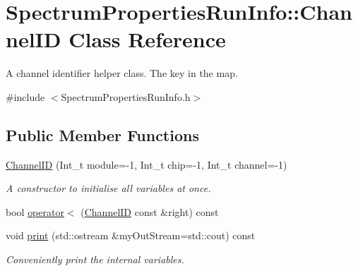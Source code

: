 \hypertarget{class_spectrum_properties_run_info_1_1_channel_i_d}{\section{Spectrum\-Properties\-Run\-Info\-:\-:Channel\-I\-D Class Reference}
\label{class_spectrum_properties_run_info_1_1_channel_i_d}
}


A channel identifier helper class. The key in the map.  




{\ttfamily \#include $<$Spectrum\-Properties\-Run\-Info.\-h$>$}

\subsection*{Public Member Functions}
\begin{DoxyCompactItemize}
\item 
\hyperlink{class_spectrum_properties_run_info_1_1_channel_i_d_a6236116c05bc9cdd93fc5f2bc84a5401}{Channel\-I\-D} (Int\-\_\-t module=-\/1, Int\-\_\-t chip=-\/1, Int\-\_\-t channel=-\/1)
\begin{DoxyCompactList}\small\item\em A constructor to initialise all variables at once. \end{DoxyCompactList}\item 
bool \hyperlink{class_spectrum_properties_run_info_1_1_channel_i_d_a9edace27ee12f1a69137725dbdee49ef}{operator$<$} (\hyperlink{class_spectrum_properties_run_info_1_1_channel_i_d}{Channel\-I\-D} const \&right) const 
\item 
void \hyperlink{class_spectrum_properties_run_info_1_1_channel_i_d_a64f1597a30c83a3edae8673ed731df72}{print} (std\-::ostream \&my\-Out\-Stream=std\-::cout) const 
\begin{DoxyCompactList}\small\item\em Conveniently print the internal variables. \end{DoxyCompactList}\end{DoxyCompactItemize}
